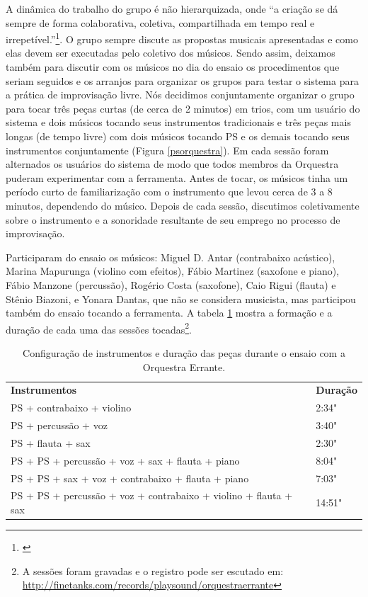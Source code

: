 A dinâmica do trabalho do grupo é não hierarquizada, onde ``a criação se dá sempre de forma colaborativa, coletiva, compartilhada em tempo real e irrepetível.''\footnote{\cite{costa2013orquestra}}. O grupo sempre discute as propostas musicais apresentadas e como elas devem ser executadas pelo coletivo dos músicos. Sendo assim, deixamos também para discutir com os músicos no dia do ensaio os procedimentos que seriam seguidos e os arranjos para organizar os grupos para testar o sistema para a prática de improvisação livre. Nós decidimos conjuntamente organizar o grupo para tocar três peças curtas (de cerca de 2 minutos) em trios, com um usuário do sistema e dois músicos tocando seus instrumentos tradicionais e três peças mais longas (de tempo livre) com dois músicos tocando PS e os demais tocando seus instrumentos conjuntamente (Figura \ref{psorquestra}). Em cada sessão foram alternados os usuários do sistema de modo que todos membros da Orquestra puderam experimentar com a ferramenta. Antes de tocar, os músicos tinha um período curto de familiarização com o instrumento que levou cerca de 3 a 8 minutos, dependendo do músico. Depois de cada sessão, discutimos coletivamente sobre o instrumento e a sonoridade resultante de seu emprego no processo de improvisação.


Participaram do ensaio os músicos: Miguel D. Antar (contrabaixo acústico), Marina Mapurunga (violino com efeitos), Fábio Martinez (saxofone e piano), Fábio Manzone (percussão), Rogério Costa (saxofone), Caio Rigui (flauta) e Stênio Biazoni, e Yonara Dantas, que não se considera musicista, mas participou também do ensaio tocando a ferramenta. A tabela \ref{tab:orchestra} mostra a formação e a duração de cada uma das sessões tocadas\footnote{A sessões foram gravadas e o registro pode ser escutado em: \url{http://finetanks.com/records/playsound/orquestraerrante}}.  

\begin{table}[ht]
\caption{Configuração de instrumentos e duração das peças durante o ensaio com a Orquestra Errante.}
\begin{tabular}{ll}
\textbf{Instrumentos}                                                    & \textbf{Duração} \\
PS + contrabaixo + violino                                & 2:34"         \\
PS + percussão + voz                                                 & 3:40"         \\
PS + flauta + sax                                                        & 2:30"         \\
PS + PS + percussão + voz + sax + flauta + piano                      & 8:04"         \\
PS + PS + sax + voz + contrabaixo + flauta + piano                   & 7:03"         \\
PS + PS + percussão + voz + contrabaixo + violino + flauta + sax & 14:51"       
\end{tabular}
\label{tab:orchestra}
\end{table}



